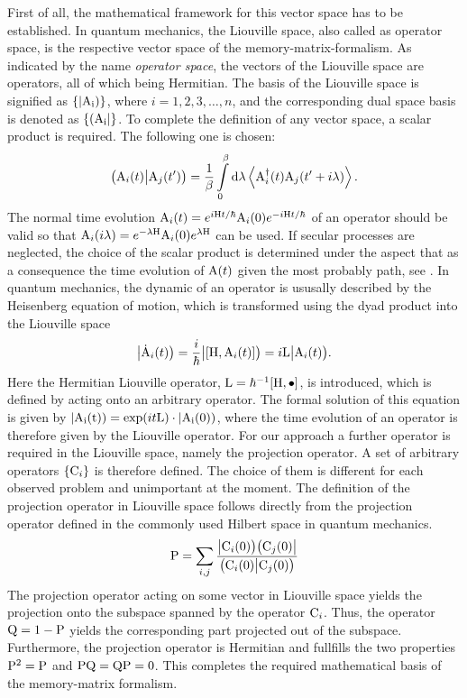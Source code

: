 First of all, the mathematical framework for this vector space has to be established.
In quantum mechanics, the Liouville space, also called as operator space, is the respective vector space of the memory-matrix-formalism.
As indicated by the name \emph{operator space}, the vectors of the Liouville space are operators, all of which being Hermitian.
The basis of the Liouville space is signified as $\{|\mathrm{\mathrm{A}_{i}})\}$, where $i = 1,2,3,\dots,n$, and the corresponding dual space basis is denoted as $\{(\mathrm{\mathrm{A}_{i}}|\}$.
To complete the definition of any vector space, a scalar product is required.
The following one is chosen:
%
\begin{align}
	\big({\mathrm{A}_{i}(t)}\big|{\mathrm{A}_{j}(t')}\big) = \frac{1}{\beta} \int\limits_{0}^{\beta} \dd{\lambda} \expval{\mathrm{A}_{i}^{\dag}(t) \mathrm{A}_{j}(t'+i\lambda)}.
	\label{eq:scalar product Liouville space}
\end{align}
%
The normal time evolution $\mathrm{A}_{i}(t) = e^{i\mathrm{H}t/\hbar} \mathrm{A}_{i}(0) e^{-i\mathrm{H}t/\hbar}$ of an operator should be valid so that $\mathrm{A}_{i}(i\lambda) = e^{-\lambda\mathrm{H}} \mathrm{A}_{i}(0) e^{\lambda\mathrm{H}}$ can be used.
If secular processes are neglected, the choice of the scalar product is determined under the aspect that as a consequence the time evolution of $\mathrm{A}(t)$ given the most probably path, see \cite{Mori}.
In quantum mechanics, the dynamic of an operator is ususally described by the Heisenberg equation of motion, which is transformed using the dyad product into the Liouville space
%
\begin{align}
	\oket{\dot{\mt{A}}_{i}(t)} = \frac{i}{\hbar} \oket{\comm{\mt{H}}{\mt{A}_{i}(t)}} = i \mt{L} \oket{\mt{A}_{i}(t)}.
	\label{eq:HEM in LS}
\end{align}
%
Here the Hermitian Liouville operator, ${\mt{L} = \hbar^{-1} \comm{\mt{H}}{\mt{\bullet}}}$, is introduced, which is defined by acting onto an arbitrary operator. 
The formal solution of this equation is given by $|\mathrm{\mathrm{A}_{i}(t)}) = \exp(it\mathrm{L}) \cdot |\mathrm{\mathrm{A}_{i}(0)})$, where the time evolution of an operator is therefore given by the Liouville operator.
For our approach a further operator is required in the Liouville space, namely the projection operator.
A set of arbitrary operators $\{\mathrm{C}_{i}\}$ is therefore defined.
The choice of them is different for each observed problem and unimportant at the moment.
The definition of the projection operator in Liouville space follows directly from the projection operator defined in the commonly used Hilbert space in quantum mechanics.
%
\begin{align}
	\mathrm{P} = \sum\limits_{i,j} \frac{\big|{\mathrm{C}_{i}(0)}\big) \big({\mathrm{C}_{j}(0)}\big|}{\big({\mathrm{C}_{i}(0)}\big|{\mathrm{C}_{j}(0)}\big)} 
	\label{eq:projection operator}
\end{align}
%
The projection operator acting on some vector in Liouville space yields the projection onto the subspace spanned by the operator $\mathrm{C}_{i}$.
Thus, the operator $\mathrm{Q} = 1 - \mathrm{P}$ yields the corresponding part projected out of the subspace.
Furthermore, the projection operator is Hermitian and fullfills the two properties $\mathrm{P}^{2} = \mathrm{P}$ and $\mathrm{PQ} = \mathrm{QP} = 0$.
This completes the required mathematical basis of the memory-matrix formalism.

